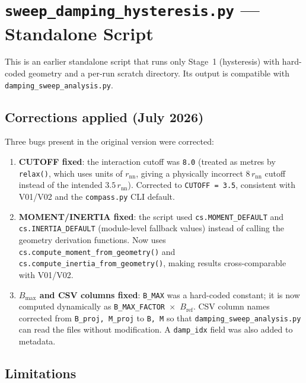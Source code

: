 \documentclass[11pt,a4paper]{article}
\newcommand{\code}[1]{\texttt{#1}}
\newcommand{\file}[1]{\texttt{#1}}
\begin{document}
\section{\texttt{sweep\_damping\_hysteresis.py} --- Standalone Script}
\label{sec:standalone}

This is an earlier standalone script that runs only Stage~1 (hysteresis) with
hard-coded geometry and a per-run scratch directory.  Its output is compatible
with \file{damping\_sweep\_analysis.py}.

\subsection{Corrections applied (July 2026)}

Three bugs present in the original version were corrected:

\begin{enumerate}
  \item \textbf{CUTOFF fixed}: the interaction cutoff was \texttt{8.0} (treated
    as metres by \code{relax()}, which uses units of $r_{\mathrm{nn}}$, giving
    a physically incorrect $8\,r_{\mathrm{nn}}$ cutoff instead of the intended
    $3.5\,r_{\mathrm{nn}}$).  Corrected to \texttt{CUTOFF = 3.5}, consistent
    with V01/V02 and the \texttt{compass.py} CLI default.

  \item \textbf{MOMENT/INERTIA fixed}: the script used
    \code{cs.MOMENT\_DEFAULT} and \code{cs.INERTIA\_DEFAULT} (module-level
    fallback values) instead of calling the geometry derivation functions.
    Now uses \code{cs.compute\_moment\_from\_geometry()} and
    \code{cs.compute\_inertia\_from\_geometry()}, making results
    cross-comparable with V01/V02.

  \item \textbf{$B_{\max}$ and CSV columns fixed}: \code{B\_MAX} was a hard-coded
    constant; it is now computed dynamically as \texttt{B\_MAX\_FACTOR~$\times$~$B_{\mathrm{ref}}$}.
    CSV column names corrected from \texttt{B\_proj, M\_proj} to \texttt{B, M}
    so that \file{damping\_sweep\_analysis.py} can read the files without
    modification.  A \texttt{damp\_idx} field was also added to metadata.
\end{enumerate}

\subsection{Limitations}
\end{document}
